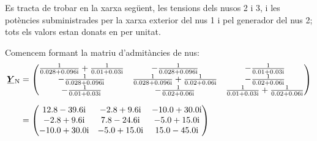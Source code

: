 \begin{exemple}\label{ex:FluxCarrXarxa}
	\addcontentsxms{\FluxCarrXarxa}
    Es tracta de trobar en la xarxa següent, les tensions dels nusos 2
    i 3, i les potències subministrades per la xarxa exterior del nus 1 i pel generador del  nus 2;
    tots els valors estan donats en per unitat.
    \begin{center}
        
    \end{center}

    Comencem formant la matriu d'admitàncies de nus:
    \begin{align*}
    \mcmplx{Y}\ped{N} &= \begin{pmatrix}
    \frac{1}{\complexnum{0,028+j0,096}} + \frac{1}{\complexnum{0,01+j0,03}} & -\frac{1}{\complexnum{0,028+j0,096}}  &  -\frac{1}{\complexnum{0,01+j0,03}}\\
    -\frac{1}{\complexnum{0,028+j0,096}} & \frac{1}{\complexnum{0,028+j0,096}} + \frac{1}{\complexnum{0,02+j0,06}} &  -\frac{1}{\complexnum{0,02+j0,06}}\\
    -\frac{1}{\complexnum{0,01+j0,03}} & -\frac{1}{\complexnum{0,02+j0,06}} &
    \frac{1}{\complexnum{0,01+j0,03}} + \frac{1}{\complexnum{0,02+j0,06}}
    \end{pmatrix}  \\[1.5ex]
     &= \begin{pmatrix}
    \complexnum{12,8 - j 39,6} & \complexnum{-2,8 + j 9,6} & \complexnum{-10,0 + j 30,0} \\
    \complexnum{-2,8 + j 9,6} & \complexnum{7,8 - j 24,6} & \complexnum{-5,0 + j 15,0} \\
    \complexnum{-10,0 + j 30,0} & \complexnum{-5,0 + j 15,0} & \complexnum{15,0 - j 45,0}
    \end{pmatrix}
    \end{align*}


\end{exemple}
